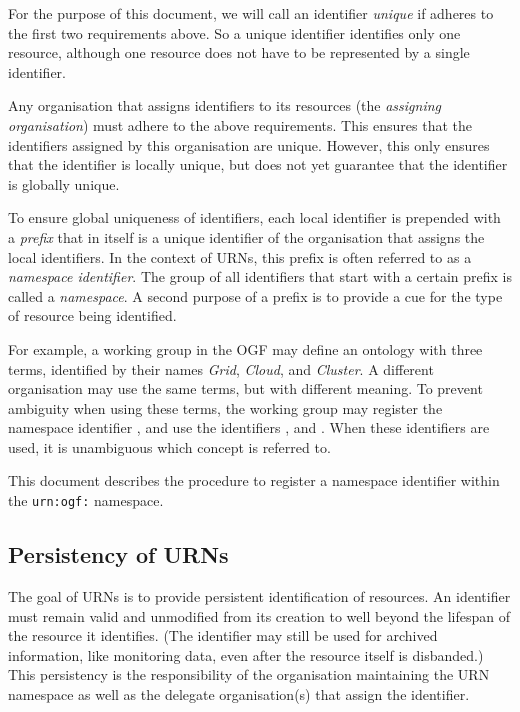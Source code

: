 \documentclass[12pt]{article}  %
\begin{document}
For the purpose of this document, we will call an identifier \emph{unique} if
adheres to the first two requirements above. So a unique identifier
identifies only one resource, although one resource does not have to be
represented by a single identifier.

Any organisation that assigns identifiers to its resources (the \emph{assigning 
organisation}) must adhere to the
above requirements. This ensures that the identifiers assigned by this
organisation are unique. However, this only ensures that the identifier is
locally unique, but does not yet guarantee that the identifier is globally
unique.

To ensure global uniqueness of identifiers, each local identifier is
prepended with a \emph{prefix} that in itself is a unique identifier of the
organisation that assigns the local identifiers. In the context of URNs, this
prefix is often referred to as a \emph{namespace identifier}. The group of
all identifiers that start with a certain prefix is called a
\emph{namespace}. 
A second purpose of a prefix is to provide a cue for the
type of resource being identified.

For example, a working group in the OGF may define an ontology with three
terms, identified by their names \emph{Grid}, \emph{Cloud}, and
\emph{Cluster}. A different organisation may use the same terms, but with
different meaning. To prevent ambiguity when using these terms, the working
group may register the namespace identifier , and
use the identifiers ,
 and .
When these identifiers are used, it is unambiguous which concept is 
referred to.

This document describes the procedure to register a namespace identifier
within the \texttt{urn:ogf:} namespace.

\subsection{Persistency of URNs}%
\label{sec:persistency}

The goal of URNs is to provide persistent identification of resources. An
identifier must remain valid and unmodified from its creation to well beyond
the lifespan of the resource it identifies. (The identifier may still be used 
for archived information, like monitoring data, even after the resource itself 
is disbanded.) This persistency is the
responsibility of the organisation maintaining the URN namespace as well as
the delegate organisation(s) that assign the identifier.
\end{document}
